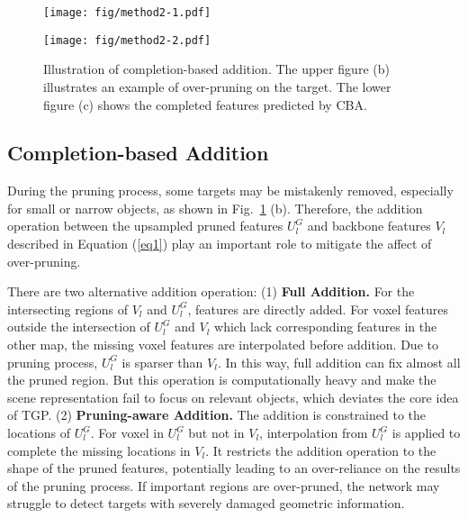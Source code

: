 \begin{figure}[t]
  \centering
  \begin{minipage}{0.47\textwidth}
    \centering
    \texttt{[image: fig/method2-1.pdf]}
  \end{minipage}

  \vspace{0.2cm} %

  \begin{minipage}{0.47\textwidth}
    \centering
    \texttt{[image: fig/method2-2.pdf]}
  \end{minipage}
 \vspace{-0.2cm}
  \caption{Illustration of completion-based addition. The upper figure (b) illustrates an example of over-pruning on the target. The lower figure (c) shows the completed features predicted by CBA.}
  \label{fig:cba}
  \vspace{-0.2cm}
\end{figure}


\subsection{Completion-based Addition}
\label{sec:3.3}
During the pruning process, some targets may be mistakenly removed, especially for small or narrow objects, as shown in Fig.~\ref{fig:cba} (b). Therefore, the addition operation between the upsampled pruned features $U^G_l$ and backbone features $V_l$ described in Equation (\ref{eq1}) play an important role to mitigate the affect of over-pruning.


There are two alternative addition operation: (1) \textbf{Full Addition.} For the intersecting regions of $V_l$ and $U^G_l$, features are directly added. For voxel features outside the intersection of $U^G_l$ and $V_l$ which lack corresponding features in the other map, the missing voxel features are interpolated before addition. Due to pruning process, $U^G_l$ is sparser than $V_l$. In this way, full addition can fix almost all the pruned region. But this operation is computationally heavy and make the scene representation fail to focus on relevant objects, which deviates the core idea of TGP.
(2) \textbf{Pruning-aware Addition.} The addition is constrained to the locations of $U^G_l$. For voxel in $U^G_l$ but not in $V_l$, interpolation from $U^G_l$ is applied to complete the missing locations in $V_l$. It restricts the addition operation to the shape of the pruned features, potentially leading to an over-reliance on the results of the pruning process. If important regions are over-pruned, the network may struggle to detect targets with severely damaged geometric information.

